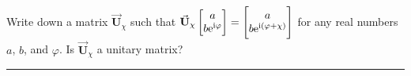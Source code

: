 \documentclass[11pt,letter]{article}
\newcommand{\vmat}[1]{\vec{\mathbf{#1}}} %
\newcommand{\mathe}{\mathrm{e}}
\newcommand{\mathi}{\mathrm{i}}
\begin{document}
\begin{solution}
\end{solution}

\pagebreak %

\begin{problem}
  Write down a matrix $\vmat{U}_{\chi}$ such that
  $\vmat{U}_{\chi} \begin{bmatrix} a \\ b\mathe^{\mathi\varphi} \end{bmatrix}
  = \begin{bmatrix} a \\ b\mathe^{\mathi\del{\varphi+\chi}} \end{bmatrix}$ for
  any real numbers $a$, $b$, and $\varphi$.  Is $\vmat{U}_{\chi}$ a unitary
  matrix?
\end{problem}

\begin{solution}

\end{solution}


\vfill

\hrule
\vspace{\baselineskip}

\begin{center}
  \ccZeroTextNotice{}
\end{center}

\end{document}
